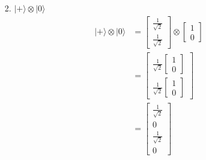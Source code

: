 \documentclass[main.tex]{subfiles}
\begin{document}
\begin{enumerate}
\begin{enumerate}
        \item[2.] $|+\rangle \otimes|0\rangle$
        \begin{align*}
            |+\rangle \otimes |0\rangle     & = \left[\begin{array}{l}\frac{1}{\sqrt{2}} \\ \frac{1}{\sqrt{2}} \end{array}\right]   
                                            \otimes\left[\begin{array}{l} 1 \\ 0 \end{array}\right] \\
                                            & = \left[\begin{array}{l} \frac{1}{\sqrt{2}}
                                            \left[\begin{array}{l} 1 \\ 0 \end{array}\right]\\ 
                                            \frac{1}{\sqrt{2}}
                                            \left[\begin{array}{l} 1 \\ 0 \end{array}\right]
                                            \end{array}\right] \\
                                            & = \left[\begin{array}{l} \frac{1}{\sqrt{2}} \\ 0 \\
                                            \frac{1}{\sqrt{2}} \\ 0 \end{array}\right]
        \end{align*}
    \end{enumerate}


\end{enumerate}
\end{document}
